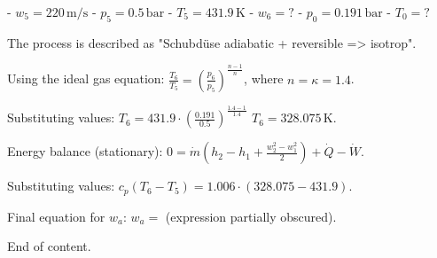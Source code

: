 - \( w_5 = 220 \, \text{m/s} \)  
- \( p_5 = 0.5 \, \text{bar} \)  
- \( T_5 = 431.9 \, \text{K} \)  
- \( w_6 = ? \)  
- \( p_0 = 0.191 \, \text{bar} \)  
- \( T_0 = ? \)  

The process is described as "Schubdüse adiabatic + reversible => isotrop".  

Using the ideal gas equation:  
\( \frac{T_6}{T_5} = \left( \frac{p_6}{p_5} \right)^{\frac{n-1}{n}} \), where \( n = \kappa = 1.4 \).  

Substituting values:  
\( T_6 = 431.9 \cdot \left( \frac{0.191}{0.5} \right)^{\frac{1.4-1}{1.4}} \)  
\( T_6 = 328.075 \, \text{K} \).  

Energy balance (stationary):  
\( 0 = \dot{m} \left( h_2 - h_1 + \frac{w_2^2 - w_1^2}{2} \right) + \dot{Q} - \dot{W} \).  

Substituting values:  
\( c_p (T_6 - T_5) = 1.006 \cdot (328.075 - 431.9) \).  

Final equation for \( w_a \):  
\( w_a = \) (expression partially obscured).  

End of content.